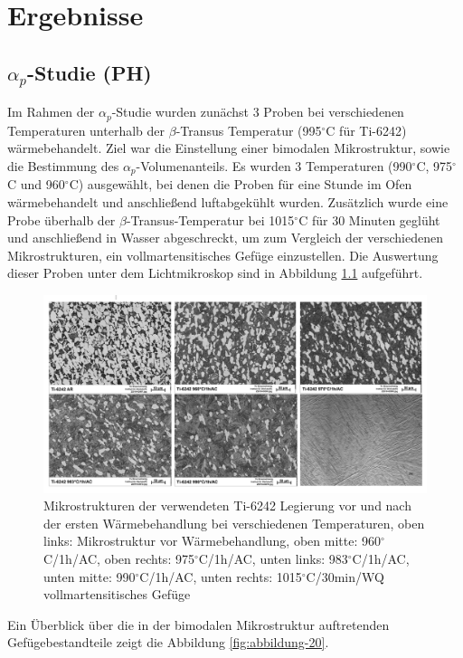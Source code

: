 \chapter {Ergebnisse}

\section{$\alpha_p$-Studie (PH)}

Im Rahmen der $\alpha_p$-Studie wurden zunächst 3 Proben bei verschiedenen Temperaturen unterhalb der $\beta$-Transus Temperatur (995$^\circ$C für Ti-6242) wärmebehandelt. Ziel war die Einstellung einer bimodalen Mikrostruktur, sowie die Bestimmung des $\alpha_p$-Volumenanteils. Es wurden 3 Temperaturen (990$^\circ$C, 975$^\circ$C und 960$^\circ$C) ausgewählt, bei denen die Proben für eine Stunde im Ofen wärmebehandelt und anschließend luftabgekühlt wurden. Zusätzlich wurde eine Probe überhalb der $\beta$-Transus-Temperatur bei 1015$^\circ$C für 30 Minuten geglüht und anschließend in Wasser abgeschreckt, um zum Vergleich der verschiedenen Mikrostrukturen, ein vollmartensitisches Gefüge einzustellen. Die Auswertung dieser Proben unter dem Lichtmikroskop sind in Abbildung \ref{fig:abbildung-8} aufgeführt. 

\begin{figure}[h]
	\centering
	\includegraphics[width=0.9\linewidth]{./Bilder/Abbildung 8}
	\caption[Abbildung 8]{Mikrostrukturen der verwendeten Ti-6242 Legierung vor und nach der ersten Wärmebehandlung bei verschiedenen Temperaturen, oben links: Mikrostruktur vor Wärmebehandlung, oben mitte: 960$^\circ$C/1h/AC, oben rechts: 975$^\circ$C/1h/AC, unten links: 983$^\circ$C/1h/AC, unten mitte: 990$^\circ$C/1h/AC, unten rechts: 1015$^\circ$C/30min/WQ vollmartensitisches Gefüge}
	\label{fig:abbildung-8}
\end{figure}

Ein Überblick über die in der bimodalen Mikrostruktur auftretenden Gefügebestandteile zeigt die Abbildung \ref{fig:abbildung-20}.

